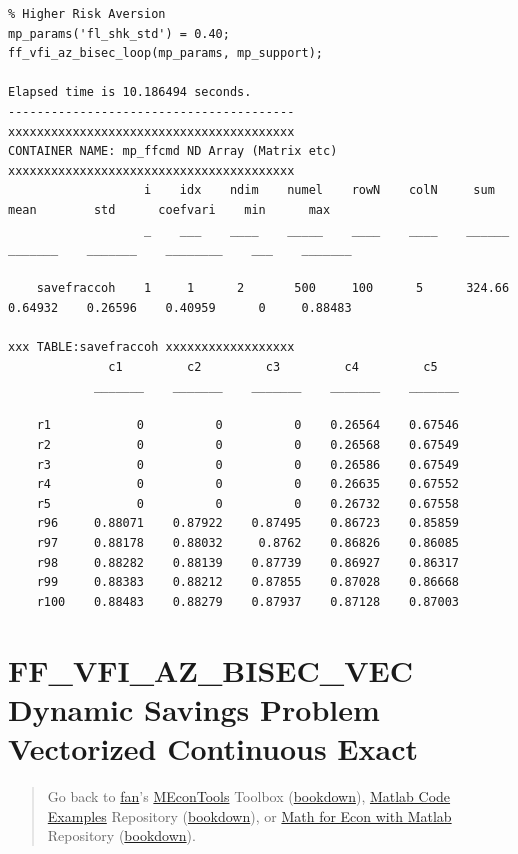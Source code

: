 \documentclass[
]{book}
\begin{document}
\begin{verbatim}
% Higher Risk Aversion
mp_params('fl_shk_std') = 0.40;
ff_vfi_az_bisec_loop(mp_params, mp_support);

Elapsed time is 10.186494 seconds.
----------------------------------------
xxxxxxxxxxxxxxxxxxxxxxxxxxxxxxxxxxxxxxxx
CONTAINER NAME: mp_ffcmd ND Array (Matrix etc)
xxxxxxxxxxxxxxxxxxxxxxxxxxxxxxxxxxxxxxxx
                   i    idx    ndim    numel    rowN    colN     sum       mean        std      coefvari    min      max  
                   _    ___    ____    _____    ____    ____    ______    _______    _______    ________    ___    _______

    savefraccoh    1     1      2       500     100      5      324.66    0.64932    0.26596    0.40959      0     0.88483

xxx TABLE:savefraccoh xxxxxxxxxxxxxxxxxx
              c1         c2         c3         c4         c5   
            _______    _______    _______    _______    _______

    r1            0          0          0    0.26564    0.67546
    r2            0          0          0    0.26568    0.67549
    r3            0          0          0    0.26586    0.67549
    r4            0          0          0    0.26635    0.67552
    r5            0          0          0    0.26732    0.67558
    r96     0.88071    0.87922    0.87495    0.86723    0.85859
    r97     0.88178    0.88032     0.8762    0.86826    0.86085
    r98     0.88282    0.88139    0.87739    0.86927    0.86317
    r99     0.88383    0.88212    0.87855    0.87028    0.86668
    r100    0.88483    0.88279    0.87937    0.87128    0.87003
\end{verbatim}

\hypertarget{ff_vfi_az_bisec_vec-dynamic-savings-problem-vectorized-continuous-exact}{%
\section{FF\_VFI\_AZ\_BISEC\_VEC Dynamic Savings Problem Vectorized Continuous Exact}\label{ff_vfi_az_bisec_vec-dynamic-savings-problem-vectorized-continuous-exact}}

\begin{quote}
Go back to \href{http://fanwangecon.github.io/}{fan}'s \href{https://fanwangecon.github.io/MEconTools/}{MEconTools} Toolbox (\href{https://fanwangecon.github.io/MEconTools/bookdown}{bookdown}), \href{https://fanwangecon.github.io/M4Econ/}{Matlab Code Examples} Repository (\href{https://fanwangecon.github.io/M4Econ/bookdown}{bookdown}), or \href{https://fanwangecon.github.io/Math4Econ/}{Math for Econ with Matlab} Repository (\href{https://fanwangecon.github.io/Math4Econ/bookdown}{bookdown}).
\end{quote}
\end{document}
